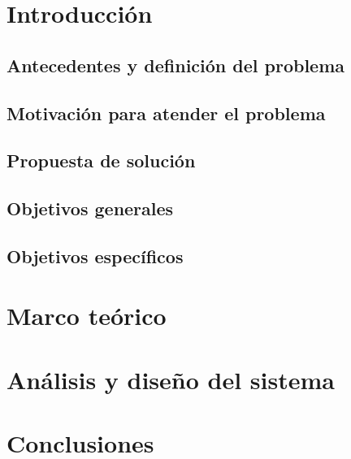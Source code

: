 \documentclass[12pt]{report}
\begin{document}
\newpage

 
\newpage


\newpage
\tableofcontents

\newpage
\listoftables
{} %
\listoffigures
{}
\lstlistoflistings

\chapter{Introducción}


\section{Antecedentes y definición del problema}


\section{Motivación para atender el problema}


\section{Propuesta de solución}


\section{Objetivos generales}


\section{Objetivos específicos}



\chapter{Marco teórico}


\chapter{Análisis y diseño del sistema}


\chapter{Conclusiones}


\printbibliography
 
\printglossary

\clearpage

\printglossary[type=\acronymtype]
\end{document}
